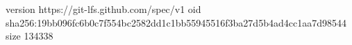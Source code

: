 version https://git-lfs.github.com/spec/v1
oid sha256:19bb096fc6b0c7f554bc2582dd1c1bb55945516f3ba27d5b4ad4cc1aa7d98544
size 134338
